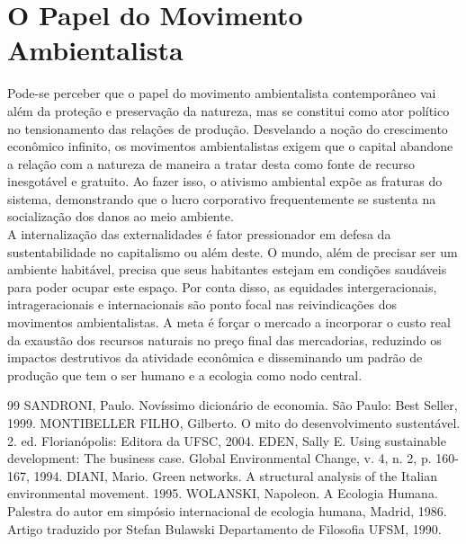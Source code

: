 \documentclass[12pt, a4paper]{article}
\begin{document}
\section{O Papel do Movimento Ambientalista}
	
	Pode-se perceber que o papel do movimento ambientalista contemporâneo vai além da proteção e preservação da natureza, mas se constitui como ator político no tensionamento das relações de produção. Desvelando a noção do crescimento econômico infinito, os movimentos ambientalistas exigem que o capital abandone a relação com a natureza de maneira a tratar desta como fonte de recurso inesgotável e gratuito. Ao fazer isso, o ativismo ambiental expõe as fraturas do sistema, demonstrando que o lucro corporativo frequentemente se sustenta na socialização dos danos ao meio ambiente.
	\\
	
	A internalização das externalidades é fator pressionador em defesa da sustentabilidade no capitalismo ou além deste. O mundo, além de precisar ser um ambiente habitável, precisa que seus habitantes estejam em condições saudáveis para poder ocupar este espaço. Por conta disso, as equidades intergeracionais, intrageracionais e internacionais são ponto focal nas reivindicações dos movimentos ambientalistas. A meta é forçar o mercado a incorporar o custo real da exaustão dos recursos naturais no preço final das mercadorias, reduzindo os impactos destrutivos da atividade econômica e disseminando um padrão de produção que tem o ser humano e a ecologia como nodo central.






\begin{thebibliography}{99}
	 SANDRONI, Paulo. Novíssimo dicionário de economia. São Paulo: Best Seller, 1999.
	 MONTIBELLER FILHO, Gilberto. O mito do desenvolvimento sustentável. 2. ed. Florianópolis: Editora da UFSC, 2004.
	 EDEN, Sally E. Using sustainable development: The business case. Global Environmental Change, v. 4, n. 2, p. 160-167, 1994.
	 DIANI, Mario. Green networks. A structural analysis of the Italian environmental movement. 1995.
	 WOLANSKI, Napoleon. A Ecologia Humana. Palestra do autor em simpósio internacional de ecologia humana, Madrid, 1986. Artigo traduzido por Stefan Bulawski Departamento de Filosofia UFSM, 1990.
\end{thebibliography}
%
\end{document}

